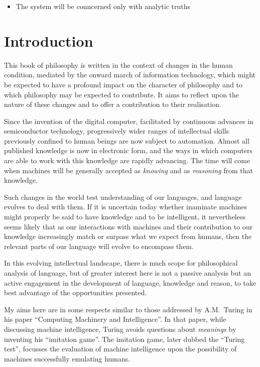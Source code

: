 \begin{itemize}
\item The system will be conncerned only with analytic truths
\end {itemize}

\chapter{Introduction}\label{IntroductionB}

This book of philosophy is written in the context of changes in the human
condition, mediated by the onward march of information technology, which
might be expected to have a profound impact on the character of philosophy
and to which philosophy may be expected to contribute.
It aims to reflect upon the nature of these changes and to offer a contribution
to their realisation.

Since the invention of the digital computer, facilitated by continuous advances
in semiconductor technology, progressively wider ranges of intellectual skills
previously confined to human beings are now subject to automation.
Almost all published knowledge is now in electronic form, and the ways in which
computers are able to work with this knowledge are rapidly advancing.
The time will come when machines will be generally accepted as {\it knowing}
and as {\it reasoning} from that knowledge.

Such changes in the world test understanding of our languages, and language
evolves to deal with them.
If it is uncertain today whether inaminate machines might properly be said to
have knowledge and to be intelligent, it nevertheless seems likely that as our
interactions with machines and their contribution to our knowledge increasingly
match or surpass what we expect from humans, then the relevant parts of our
language will evolve to encompass them.

In this evolving intellectual landscape, there is much scope for philosophical
analysis of language, but of greater interest here is not a passive analysis but
an active engagement in the development of language, knowledge and reason, to take
best advantage of the opportunities presented.

My aims here are in some respects similar to those addressed by A.M.~Turing
in his paper ``Computing Machinery and Intelligence''.
In that paper, while discussing machine intelligence, Turing avoids questions
about {\it meanings} by inventing his ``imitation game''.
The imitation game, later dubbed the ``Turing test'', focusses the evaluation of
machine intelligence upon the possibility of machines successfully emulating humans.

